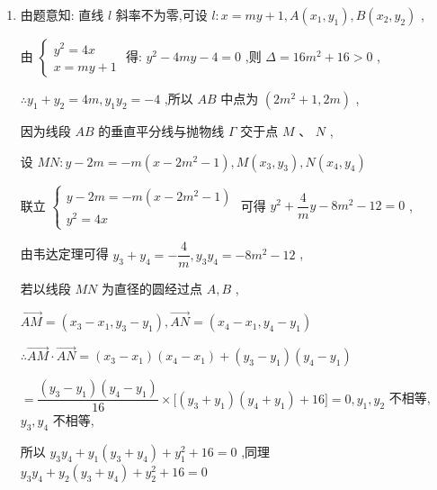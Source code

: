 \begin{enumerate}
\begin{jieda}
\begin{enumerate}
            由 $\left\{ \begin{array}{l} y^2 = 4x \\  x = my + 1 \end{array}\right.$ 得: $y^2 - 4my - 4 = 0$ ,则 $\Delta = 16m^2 + 16 > 0$ ,

            $\therefore y_1 + y_2 = 4m,\;y_{1}y_2 = - 4$ ,

            $\because F(1,0)$ ,又因为 $A,B$ 中点的纵坐标为 $\dfrac{3}{2}$ ,所以 $y_1 + y_2 = 4m = 3$ ,

            所以 $\bigtriangleup OAB$ 的面积为 $\dfrac{1}{2}|OF| \times |y_1 - y_2| = \dfrac{1}{2} \times 1 \times \sqrt{3^2 - 4 \times (-4)} = \dfrac{1}{2} \times 5 = \dfrac{5}{2}$
            \item 由题意知: 直线 $l$ 斜率不为零,可设 $l : x = my + 1,A(x_1,y_1) ,B(x_2,y_2)$ ,

            由 $\left\{ \begin{array}{l} y^2 = 4x \\  x = my + 1 \end{array}\right.$ 得: $y^2 - 4my - 4 = 0$ ,则 $\Delta = 16m^2 + 16 > 0$ ,

            $\therefore y_1 + y_2 = 4m,y_{1}y_2 = - 4$ ,所以 $AB$ 中点为 $(2m^2 + 1,2m)$ ,

            因为线段 $AB$ 的垂直平分线与抛物线 $\Gamma$ 交于点 $M\text{ 、 }N$ ,

            设 $MN : y - 2m = - m(x - 2m^2 - 1) ,M(x_3,y_3) ,N(x_4,y_4)$

            联立 $\left\{ \begin{array}{l} y - 2m = - m(x - 2m^2 - 1) \\  y^2 = 4x \end{array}\right.$ 可得 $y^2 + \dfrac{4}{m}y - 8m^2 - 12 = 0$ ,

            由韦达定理可得 $y_3 + y_4 = - \dfrac{4}{m},y_{3}y_4 = - 8m^2 - 12$ ,

            若以线段 $MN$ 为直径的圆经过点 $A,B$ ,

            $\overrightarrow{AM} = (x_3 - x_1,y_3 - y_1) ,\overrightarrow{AN} = (x_4 - x_1,y_4 - y_1)$

            $\therefore \overrightarrow{AM} \cdot \overrightarrow{AN} = (x_3 - x_1) (x_4 - x_1) + (y_3 - y_1) (y_4 - y_1)$

            $= \dfrac{(y_3 - y_1) (y_4 - y_1)}{16} \times \lbrack(y_3 + y_1) (y_4 + y_1) + 16\rbrack = 0,y_1,y_2$ 不相等, $y_3,y_4$ 不相等,

            所以 $y_{3}y_4 + y_1(y_3 + y_4) + y_1^2 + 16 = 0$ ,同理 $y_{3}y_4 + y_2(y_3 + y_4) + y_2^2 + 16 = 0$


\end{enumerate}
\end{jieda}
\end{enumerate}
